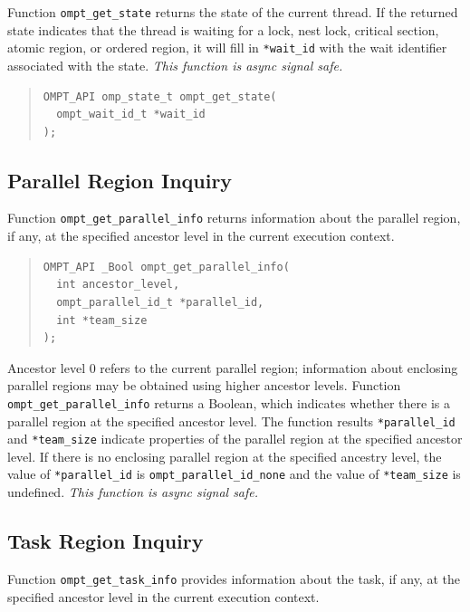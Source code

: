 \documentclass{article}
\begin{document}
Function \verb|ompt_get_state| returns the state of the 
current thread. If the returned state indicates that the thread is waiting for a lock, nest lock, critical section, atomic region, or ordered region, it will fill in \verb|*wait_id| with the wait identifier associated with the state.  {\em This function is async signal safe.}

\begin{quote}
\begin{verbatim}
OMPT_API omp_state_t ompt_get_state(
  ompt_wait_id_t *wait_id       
);
\end{verbatim}
\end{quote}
 
\subsection{Parallel Region Inquiry} 
\label{sec:parallel-inquiry} 
Function \verb|ompt_get_parallel_info| returns information about the parallel region, if any, at the specified ancestor level in the current execution context.

\begin{quote}
\begin{verbatim}
OMPT_API _Bool ompt_get_parallel_info(
  int ancestor_level,
  ompt_parallel_id_t *parallel_id, 
  int *team_size
);
\end{verbatim}
\end{quote}

\noindent 
Ancestor level 0 refers to the current parallel region; 
information about enclosing parallel regions may be obtained using higher ancestor levels. 
Function \verb|ompt_get_parallel_info| returns a Boolean, which indicates whether there is a parallel region at the specified ancestor level.
The function results \verb|*parallel_id| and \verb|*team_size| indicate properties of the parallel region at the specified ancestor level.
If there is no enclosing parallel region at the specified ancestry level, the value of \verb|*parallel_id| is \verb|ompt_parallel_id_none| and the value of \verb|*team_size| is undefined.
{\em This function is async signal safe.}
 
\subsection{Task Region Inquiry}
\label{sec:task-region}

Function \verb|ompt_get_task_info| provides information about the task, if any, at the specified ancestor level in the current execution context.
\end{document}
